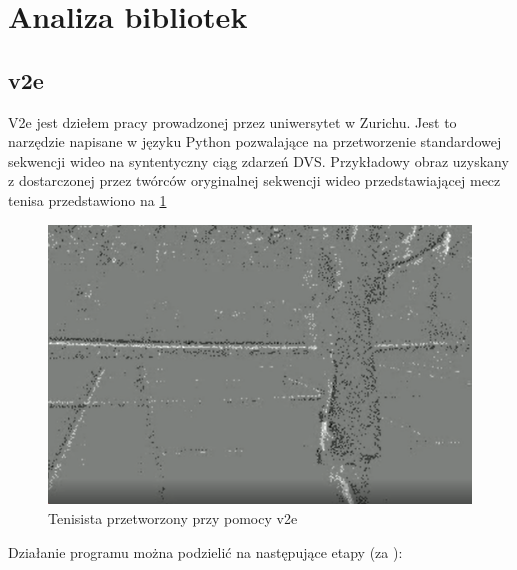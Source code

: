 \section{Analiza bibliotek}
\label{sec:Biblioteki}

    \subsection{v2e}
    \label{subsec:v2e}
    
    V2e jest dziełem pracy prowadzonej przez uniwersytet w Zurichu. Jest to narzędzie napisane w języku Python pozwalające na przetworzenie standardowej sekwencji wideo na syntentyczny ciąg zdarzeń DVS. Przykładowy obraz uzyskany z dostarczonej przez twórców oryginalnej sekwencji wideo przedstawiającej mecz tenisa przedstawiono na \ref{fig:v2e}
    
       \begin{figure}[h]
       \centering
       \includegraphics[width=\textwidth]{Codes/v2e_test/Tenis.PNG}
       \caption{Tenisista przetworzony przy pomocy v2e}
       \label{fig:v2e}
   \end{figure}
   
   Działanie programu można podzielić na następujące etapy (za \cite{v2e}):
   

